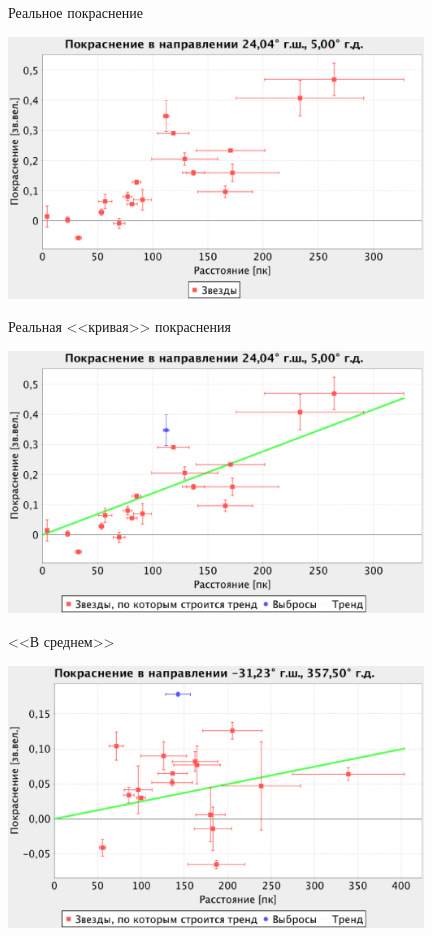\documentclass[14pt, fleqn, xcolor={dvipsnames, table}]{beamer}
\begin{document}
        \begin{frame}{Реальное покраснение}
            \begin{center}
                \includegraphics[width=11cm]{real-1.eps}
            \end{center}             
        \end{frame}
        
        \begin{frame}{Реальная <<кривая>> покраснения}
            \begin{center}
                \includegraphics[width=11cm]{real-2-k.eps}
            \end{center}             
        \end{frame}
        
        \begin{frame}{<<В среднем>>}
            \begin{center}
                \includegraphics[width=11cm]{real-3-k.eps}
            \end{center}             
        \end{frame}        
        
\end{document}
